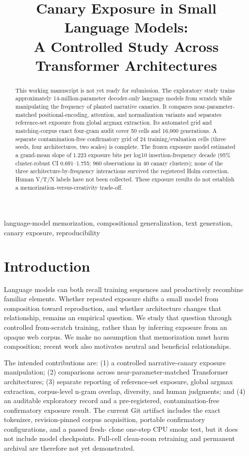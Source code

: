 \documentclass[conference]{IEEEtran}
\title{Canary Exposure in Small Language Models:\\
A Controlled Study Across Transformer Architectures}
\author{\IEEEauthorblockN{Aarav Khanal}}
\begin{document}
\maketitle

\begin{abstract}
This working manuscript is not yet ready for submission. The exploratory study trains approximately
14-million-parameter decoder-only language models from scratch while manipulating the frequency of planted
narrative canaries. It compares near-parameter-matched positional-encoding, attention, and normalization variants
and separates reference-set exposure from global argmax extraction. Its automated grid and matching-corpus exact
four-gram audit cover 50 cells and 16,000 generations. A separate contamination-free confirmatory grid of 24
training/evaluation cells (three seeds, four architectures, two scales) is complete. The frozen exposure model
estimated a grand-mean slope of 1.223 exposure bits per log10 insertion-frequency decade (95\% cluster-robust CI
0.691--1.755; 960 observations in 40 canary clusters); none of the three architecture-by-frequency interactions
survived the registered Holm correction. Human V/T/N labels have not been collected. These exposure results do not
establish a memorization-versus-creativity trade-off.
\end{abstract}

\begin{IEEEkeywords}
language-model memorization, compositional generalization, text generation, canary exposure, reproducibility
\end{IEEEkeywords}

\section{Introduction}
Language models can both recall training sequences and productively recombine familiar elements. Whether repeated
exposure shifts a small model from composition toward reproduction, and whether architecture changes that
relationship, remains an empirical question. We study that question through controlled from-scratch training,
rather than by inferring exposure from an opaque web corpus. We make no assumption that memorization must harm
composition; recent work also motivates neutral and beneficial relationships.

The intended contributions are: (1) a controlled narrative-canary exposure manipulation; (2) comparisons across
near-parameter-matched Transformer architectures; (3) separate reporting of reference-set exposure, global
argmax extraction, corpus-level n-gram overlap, diversity, and human judgments; and (4) an auditable exploratory
record and a pre-registered, contamination-free confirmatory exposure result. The current Git artifact includes
the exact tokenizer, revision-pinned corpus acquisition, portable confirmatory configurations, and a passed fresh-
clone one-step CPU smoke test, but it does not include model checkpoints. Full-cell clean-room retraining and
permanent archival are therefore not yet demonstrated.
\end{document}
